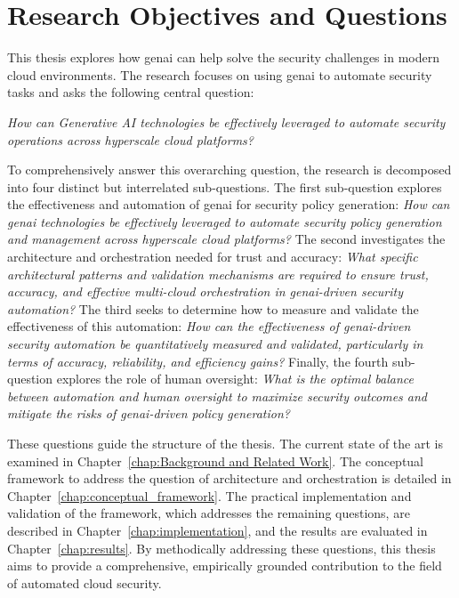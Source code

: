 \section{Research Objectives and Questions}
\label{sec:objectives_questions}

This thesis explores how \gls{genai} can help solve the security challenges in modern cloud environments. The research focuses on using \gls{genai} to automate security tasks and asks the following central question:

\textit{How can Generative AI technologies be effectively leveraged to automate security operations across hyperscale cloud platforms?}

To comprehensively answer this overarching question, the research is decomposed into four distinct but interrelated sub-questions. The first sub-question explores the effectiveness and automation of \gls{genai} for security policy generation: \textit{How can \gls{genai} technologies be effectively leveraged to automate security policy generation and management across hyperscale cloud platforms?}
The second investigates the architecture and orchestration needed for trust and accuracy: \textit{What specific architectural patterns and validation mechanisms are required to ensure trust, accuracy, and effective multi-cloud orchestration in \gls{genai}-driven security automation?}
The third seeks to determine how to measure and validate the effectiveness of this automation: \textit{How can the effectiveness of \gls{genai}-driven security automation be quantitatively measured and validated, particularly in terms of accuracy, reliability, and efficiency gains?}
Finally, the fourth sub-question explores the role of human oversight: \textit{What is the optimal balance between automation and human oversight to maximize security outcomes and mitigate the risks of \gls{genai}-driven policy generation?}

These questions guide the structure of the thesis. The current state of the art is examined in Chapter~\ref{chap:Background and Related Work}. The conceptual framework to address the question of architecture and orchestration is detailed in Chapter~\ref{chap:conceptual_framework}. The practical implementation and validation of the framework, which addresses the remaining questions, are described in Chapter~\ref{chap:implementation}, and the results are evaluated in Chapter~\ref{chap:results}. By methodically addressing these questions, this thesis aims to provide a comprehensive, empirically grounded contribution to the field of automated cloud security.

